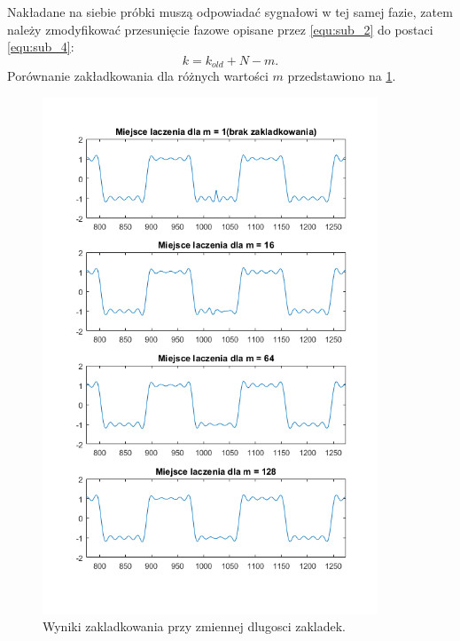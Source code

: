 Nakładane na siebie próbki muszą odpowiadać sygnałowi w tej samej fazie, zatem należy zmodyfikować przesunięcie fazowe opisane przez \ref{equ:sub_2} do postaci \ref{equ:sub_4}:
\begin{equation} \label{equ:sub_4}
k = k_{old} + N - m.
\end{equation}
Porównanie zakładkowania dla różnych wartości $m$ przedstawiono na \ref{rys:sub_overlaps}.
\begin{figure}[H]
	\centering
	\includegraphics[width=10cm]{grafiki/sub_overlaps}
	\captionsetup{justification=centering}
	\caption{Wyniki zakladkowania przy zmiennej dlugosci zakladek.}
	\label{rys:sub_overlaps}
\end{figure}